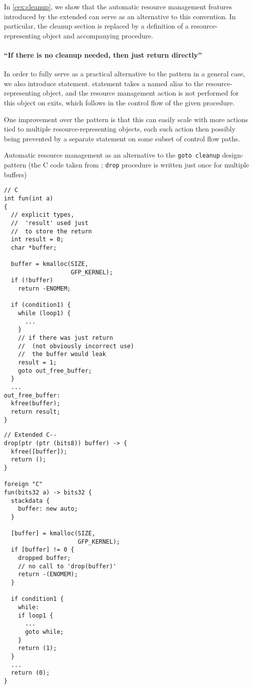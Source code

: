 In \cref{cex:cleanup}, we show that the automatic resource management features introduced by the extended \cmm can serve as an alternative to this convention. In particular, the cleanup section is replaced by a definition of a resource-representing object and accompanying  procedure.

\paragraph{``If there is no cleanup needed, then just return directly''} In order to fully serve as a practical alternative to the  pattern in a general case, we also introduce  statement.  statement takes a named alias to the resource-representing object, and the resource management action is not performed for this object on exits, which follows in the control flow of the given procedure.

One improvement over the  pattern is that this can easily scale with more actions tied to multiple resource-representing objects, each such action then possibly being prevented by a separate  statement on some subset of control flow paths.

\begin{codex}
  \caption{Automatic resource management as an alternative to the \texttt{goto cleanup} design-pattern (the C code taken from  \cite{kernelStyle}; \texttt{drop} procedure is written just once for multiple buffers)}
  \label{cex:cleanup}
  \begin{minipage}{0.5\linewidth}
    \begin{lstlisting}[basicstyle=\scriptsize\ttfamily]
// C
int fun(int a)
{
  // explicit types,
  //  'result' used just
  //  to store the return
  int result = 0;
  char *buffer;

  buffer = kmalloc(SIZE,
                   GFP_KERNEL);
  if (!buffer)
    return -ENOMEM;

  if (condition1) {
    while (loop1) {
      ...
    }
    // if there was just return
    //  (not obviously incorrect use)
    //  the buffer would leak
    result = 1;
    goto out_free_buffer;
  }
  ...
out_free_buffer:
  kfree(buffer);
  return result;
}
    \end{lstlisting}
  \end{minipage}%
  \begin{minipage}{0.5\linewidth}
    \begin{lstlisting}[basicstyle=\scriptsize\ttfamily]
// Extended C--
drop(ptr (ptr (bits8)) buffer) -> {
  kfree([buffer]);
  return ();
}

foreign "C"
fun(bits32 a) -> bits32 {
  stackdata {
    buffer: new auto;
  }

  [buffer] = kmalloc(SIZE,
                     GFP_KERNEL);
  if [buffer] != 0 {
    dropped buffer;
    // no call to 'drop(buffer)'
    return -(ENOMEM);
  }

  if condition1 {
    while:
    if loop1 {
      ...
      goto while;
    }
    return (1);
  }
  ...
  return (0);
}
    \end{lstlisting}
  \end{minipage}%
\end{codex}

